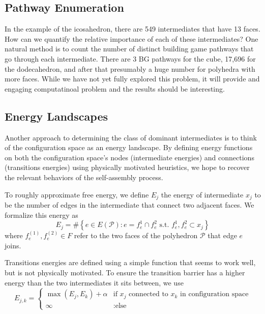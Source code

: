 \documentclass[12pt]{article}
\begin{document}
\subsection{Pathway Enumeration}
In the example of the icosahedron, there are 549 intermediates that have 13 faces. How can we quantify the relative importance of each of these intermediates? One natural method is to count the number of distinct building game pathways that go through each intermediate. There are 3 BG pathways for the cube, 17,696 for the dodecahedron, and after that presumably a huge number for polyhedra with more faces. While we have not yet fully explored this problem, it will provide and engaging computatinoal problem and the results should be interesting. 

\subsection{Energy Landscapes}

Another approach to determining the class of dominant intermediates is to think of the configuration space as an energy landscape. By defining energy functions on both the configuration space's nodes (intermediate energies) and connections (transitions energies) using physically motivated heuristics, we hope to recover the relevant behaviors of the self-assembly process. 

To roughly approximate free energy, we define $E_j$ the energy of intermediate $x_j$ to be the number of edges in the intermediate that connect two adjacent faces. We formalize this energy as
$$E_j = \#\left\{e \in E\left(\mathcal{P}\right): e = f_e^1\cap f_e^2 \textrm{ s.t. }f_e^1,f_e^2\subset x_j \right\}$$
where $f^{(1)}_e, f^{(2)}_e \in F$ refer to the two faces of the polyhedron $\mathcal{P}$ that edge $e$ joins.

Transitions energies are defined using a simple function that seems to work well, but is not physically motivated. To ensure the transition barrier has a higher energy than the two intermediates it sits between, we use 
\begin{displaymath}
   E_{j,k} = \left\{
     \begin{array}{lr}
       \max\left(E_j,E_k\right) + \alpha & \textrm{if } x_j \textrm{ connected to } x_k \textrm{ in configuration space}\\
       \infty & : \textrm{else}
     \end{array}
   \right.
\end{displaymath} 
\end{document}
